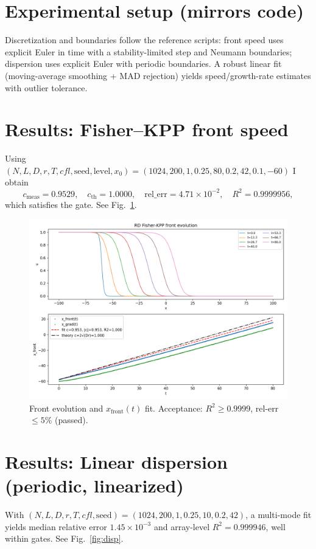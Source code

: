 \documentclass[11pt]{article}
\begin{document}
\section{Experimental setup (mirrors code)}
Discretization and boundaries follow the reference scripts: front speed uses explicit Euler in time with a stability-limited step and Neumann boundaries; dispersion uses explicit Euler with periodic boundaries. A robust linear fit (moving-average smoothing + MAD rejection) yields speed/growth-rate estimates with outlier tolerance.

\section{Results: Fisher--KPP front speed}
Using $(N,L,D,r,T,cfl,\text{seed},\text{level},x_0)=(1024,200,1,0.25,80,0.2,42,0.1,-60)$ I obtain
\[
c_{\mathrm{meas}}=0.9529,\quad c_{\mathrm{th}}=1.0000,\quad \mathrm{rel\_err}=4.71\times 10^{-2},\quad R^2=0.9999956,
\]
which satisfies the gate. See Fig.~\ref{fig:front}.

\begin{figure}[t]
\centering
\includegraphics[width=0.9\linewidth]{figs/rd_front_speed.png}
\caption{Front evolution and $x_{\mathrm{front}}(t)$ fit. Acceptance: $R^2 \ge 0.9999$, rel-err $\le 5\%$ (passed).}
\label{fig:front}
\end{figure}

\section{Results: Linear dispersion (periodic, linearized)}
With $(N,L,D,r,T,cfl,\text{seed})=(1024,200,1,0.25,10,0.2,42)$, a multi-mode fit yields median relative error $1.45\times 10^{-3}$ and array-level $R^2=0.999946$, well within gates. See Fig.~\ref{fig:disp}.
\end{document}
